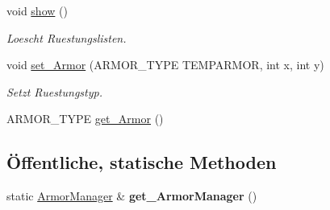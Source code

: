 \begin{DoxyCompactItemize}
\item 
void \hyperlink{class_armor_manager_a67c0b4d0206bb0916dc2c6f8ca0ee225}{show} ()
\begin{DoxyCompactList}\small\item\em Loescht Ruestungslisten. \end{DoxyCompactList}\item 
\hypertarget{class_armor_manager_ae1d12bdafa1ec883841aa311307a3b85}{void \hyperlink{class_armor_manager_ae1d12bdafa1ec883841aa311307a3b85}{set\-\_\-\-Armor} (A\-R\-M\-O\-R\-\_\-\-T\-Y\-P\-E T\-E\-M\-P\-A\-R\-M\-O\-R, int x, int y)}\label{class_armor_manager_ae1d12bdafa1ec883841aa311307a3b85}

\begin{DoxyCompactList}\small\item\em Setzt Ruestungstyp. \end{DoxyCompactList}\item 
A\-R\-M\-O\-R\-\_\-\-T\-Y\-P\-E \hyperlink{class_armor_manager_a08b4b1f42b418b09b6917767a3baae74}{get\-\_\-\-Armor} ()
\end{DoxyCompactItemize}
\subsection*{Öffentliche, statische Methoden}
\begin{DoxyCompactItemize}
\item 
\hypertarget{class_armor_manager_ac2d0437101488564e279661ae9078d5a}{static \hyperlink{class_armor_manager}{Armor\-Manager} \& {\bfseries get\-\_\-\-Armor\-Manager} ()}\label{class_armor_manager_ac2d0437101488564e279661ae9078d5a}

\end{DoxyCompactItemize}


